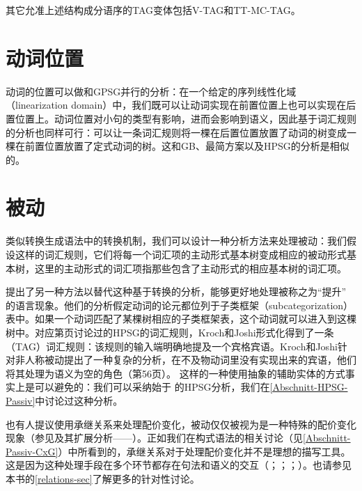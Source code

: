 其它允准上述结构成分语序的TAG变体包括V-TAG\citep{Rambow94a}和TT-MC-TAG\citep{Lichte2007a}。

\section{动词位置}

动词的位置可以做和GPSG并行的分析：在一个给定的序列线性化域（linearization domain）中，我们既可以让动词实现在前置位置上也可以实现在后置位置上。动词位置对小句的类型有影响，进而会影响到语义，因此基于词汇规则的分析也同样可行：可以让一条词汇规则将一棵在后置位置放置了动词的树变成一棵在前置位置放置了定式动词的树。这和GB、最简方案以及HPSG的分析是相似的。 

\section{被动}

类似转换生成语法中的转换机制，我们可以设计一种分析方法来处理被动：我们假设这样的词汇规则，它们将每一个词汇项的主动形式基本树变成相应的被动形式基本树\citep[--51]{KJ85a}，这里的主动形式的词汇项指那些包含了主动形式的相应基本树的词汇项。

 \citet[]{KJ85a}提出了另一种方法以替代这种基于转换的分析，能够更好地处理被称之为“提升”
的语言现象。他们的分析假定动词的论元都位列于子类框架（subcategorization）表中。如果一个动词匹配了某棵树相应的子类框架表，这个动词就可以进入到这棵树中。对应第\pageref{pass-lr-mlr}页讨论过的HPSG的词汇规则，Kroch和Joshi形式化得到了一条（TAG）词汇规则：该规则的输入端明确地提及一个宾格宾语。Kroch和Joshi针对非人称被动提出了一种复杂的分析，在不及物动词里没有实现出来的宾语，他们将其处理为语义为空的角色（第56页）。
这样的一种使用抽象的辅助实体的方式事实上是可以避免的：我们可以采纳始于 \citet{Haider86}的HPSG\indexhpsgc 分析，我们在\ref{Abschnitt-HPSG-Passiv}中讨论过这种分析。

也有人提议使用承继关系来处理配价变化，被动仅仅被视为是一种特殊的配价变化现象（参见\citealp{Candito96a}及其扩展分析——\citealp*{KSYJ2006a}）。正如我们在构式语法的相关讨论（见\ref{Abschnitt-Passiv-CxG}）中所看到的，承继关系对于处理配价变化并不是理想的描写工具。这是因为这种处理手段在多个环节都存在句法和语义的交互（\citealp{Mueller2006d,Mueller2007d}；\citeyear[\S~7.5.2]{MuellerLehrbuch1}；\citeyear{MuellerUnifying}；\citeyear{MWArgSt}）。也请参见本书的\ref{relations-sec}了解更多的针对性讨论。 

